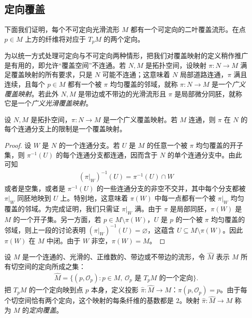 \documentclass[../../main.tex]{subfiles}
\begin{document}
\subsection{定向覆盖}

下面我们证明，每个不可定向光滑流形 $M$ 都有一个可定向的二叶覆盖流形。在点 $p\in M$ 上方的纤维将对应于 $T_pM$ 的两个定向。

为以统一方式处理可定向与不可定向两种情形，把我们对覆盖映射的定义稍作推广是有用的，即允许“覆盖空间”不连通。若 $N,M$ 是拓扑空间，设映射 $\pi:N\to M$ 满足覆盖映射的所有要求，只是 $N$ 可能不连通；这意味着 $N$ 局部道路连通，$\pi$ 满且连续，且每个 $p\in M$ 都有一个被 $\pi$ 均匀覆盖的邻域，就称 $\pi:N\to M$ 是一个\emph{广义覆盖映射}。若此外 $N,M$ 是带边或不带边的光滑流形且 $\pi$ 是局部微分同胚，就称它是一个\emph{广义光滑覆盖映射}。

\begin{lemma}\label{lemma:ch15-generalized-covering}
设 $N,M$ 是拓扑空间，$\pi:N\to M$ 是一个广义覆盖映射。若 $M$ 连通，则 $\pi$ 在 $N$ 的每个连通分支上的限制是一个覆盖映射。
\end{lemma}

\begin{proof}
设 $W$ 是 $N$ 的一个连通分支。若 $U$ 是 $M$ 的任意一个被 $\pi$ 均匀覆盖的开子集，则 $\pi^{-1}(U)$ 的每个连通分支都连通，因而含于 $N$ 的单个连通分支中。由此可知
\begin{align*}
(\pi|_W)^{-1}(U)=\pi^{-1}(U)\cap W
\end{align*}
或者是空集，或者是 $\pi^{-1}(U)$ 的一些连通分支的非空不交并，其中每个分支都被 $\pi|_W$ 同胚地映到 $U$ 上。特别地，这意味着 $\pi(W)$ 中每一点都有一个被 $\pi|_W$ 均匀覆盖的邻域。为完成证明，我们只需证 $\pi|_W$ 满。由于 $\pi$ 是局部同胚，$\pi(W)$ 是 $M$ 的一个开子集。另一方面，若 $p\in M\setminus\pi(W)$，$U$ 是 $p$ 的一个被 $\pi$ 均匀覆盖的邻域，则上一段的讨论表明 $(\pi|_W)^{-1}(U)=\varnothing$，这蕴含 $U\subseteq M\setminus\pi(W)$。因此 $\pi(W)$ 在 $M$ 中闭。由于 $W$ 非空，$\pi(W)=M$。
\end{proof}

设 $M$ 是一个连通的、光滑的、正维数的、带边或不带边的流形，令 $\widehat M$ 表示 $M$ 所有切空间的定向所成之集：
\begin{align*}
\widehat M=\{(p,\mathcal O_p):p\in M,\ \mathcal O_p\text{ 是 }T_pM\text{ 的一个定向}\}.
\end{align*}
把 $T_pM$ 的一个定向映到点 $p$ 本身，定义投影 $\widehat\pi:\widehat M\to M$：$\widehat\pi(p,\mathcal O_p)=p$。由于每个切空间恰有两个定向，这个映射的每条纤维的基数都是 $2$。映射 $\widehat\pi:\widehat M\to M$ 称为 $M$ 的\emph{定向覆盖}。
\end{document}
